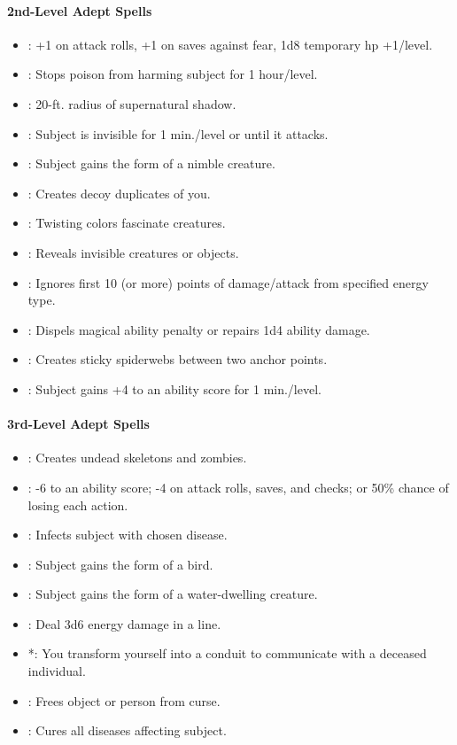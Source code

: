 \paragraph{2nd-Level Adept Spells}
\begin{itemize}
\item {}: +1 on attack rolls, +1 on saves against fear, 1d8 temporary hp +1/level.
\item {}: Stops poison from harming subject for 1 hour/level.
\item {}: 20-ft. radius of supernatural shadow.
\item {}: Subject is invisible for 1 min./level or until it attacks.
\item {}: Subject gains the form of a nimble creature.
\item {}: Creates decoy duplicates of you.
\item {}: Twisting colors fascinate creatures.
\item {}: Reveals invisible creatures or objects.
\item {}: Ignores first 10 (or more) points of damage/attack from specified energy type.
\item {}: Dispels magical ability penalty or repairs 1d4 ability damage.
\item {}: Creates sticky spiderwebs between two anchor points.
\item {}: Subject gains +4 to an ability score for 1 min./level.
\end{itemize}
\paragraph{3rd-Level Adept Spells}
\begin{itemize}
 \item {}: Creates undead skeletons and zombies.
 \item {}: -6 to an ability score; -4 on attack rolls, saves, and checks; or 50\% chance of losing each action.
 \item {}: Infects subject with chosen disease. %
 \item {}: Subject gains the form of a bird.
 \item {}: Subject gains the form of a water-dwelling creature.
 \item {}: Deal 3d6 energy damage in a line.
 \item {}*: You transform yourself into a conduit to communicate with a deceased individual.
 \item {}: Frees object or person from curse.
 \item {}: Cures all diseases affecting subject.
\end{itemize}
